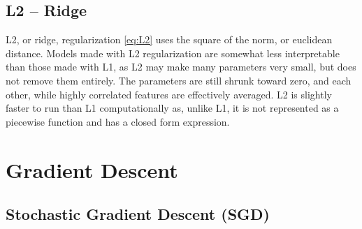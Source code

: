 \subsection{L2 -- Ridge}
\label{ml:general:reg:L2}
L2, or ridge, regularization \cref{eq:L2} uses the square of the norm, or euclidean distance.
Models made with L2 regularization are somewhat less interpretable than those made with L1,
as L2 may make many parameters very small, but does not remove them entirely.
The parameters are still shrunk toward zero, and each other,
while highly correlated features are effectively averaged.
L2 is slightly faster to run than L1 computationally as, unlike L1, it
is not represented as a piecewise function and has a closed form expression.

\section{Gradient Descent}
\label{ml:general:grad_descent}

\subsection{Stochastic Gradient Descent (SGD)}
\label{ml:general:grad_descent:stochastic}

